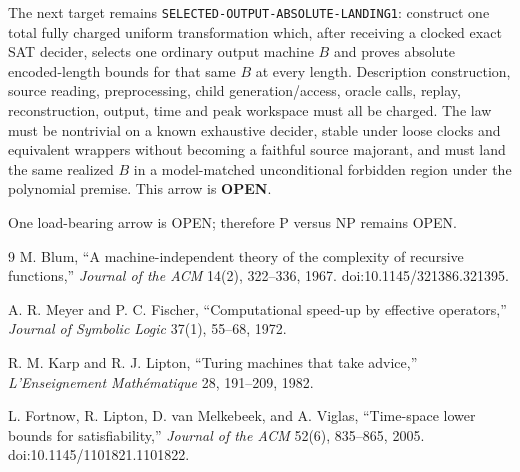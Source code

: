 \documentclass[11pt]{article}
\newcommand{\OPEN}{\textbf{OPEN}}
\begin{document}
The next target remains
\texttt{SELECTED-OUTPUT-ABSOLUTE-LANDING1}: construct one total fully charged
uniform transformation which, after receiving a clocked exact SAT decider,
selects one ordinary output machine \(B\) and proves absolute encoded-length
bounds for that same \(B\) at every length.  Description construction,
source reading, preprocessing, child generation/access, oracle calls,
replay, reconstruction, output, time and peak workspace must all be charged.
The law must be nontrivial on a known exhaustive decider, stable under loose
clocks and equivalent wrappers without becoming a faithful source majorant,
and must land the same realized \(B\) in a model-matched unconditional
forbidden region under the polynomial premise.  This arrow is \OPEN.

One load-bearing arrow is OPEN; therefore P versus NP remains OPEN.

\begin{thebibliography}{9}
M. Blum, ``A machine-independent theory of the complexity of recursive
functions,'' \emph{Journal of the ACM} 14(2), 322--336, 1967.
doi:10.1145/321386.321395.

A. R. Meyer and P. C. Fischer, ``Computational speed-up by effective
operators,'' \emph{Journal of Symbolic Logic} 37(1), 55--68, 1972.

R. M. Karp and R. J. Lipton, ``Turing machines that take advice,''
\emph{L'Enseignement Math\'ematique} 28, 191--209, 1982.

L. Fortnow, R. Lipton, D. van Melkebeek, and A. Viglas,
``Time-space lower bounds for satisfiability,'' \emph{Journal of the ACM}
52(6), 835--865, 2005. doi:10.1145/1101821.1101822.
\end{thebibliography}

\end{document}
